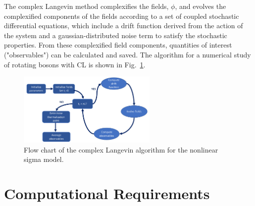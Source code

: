\documentclass[onecolumn, 12pt]{report}
\begin{document}
The complex Langevin method complexifies the fields, $\phi$, and evolves the complexified components of the fields according to a set of coupled stochastic differential equations, which include a drift function derived from the action of the system and a gaussian-distributed noise term to satisfy the stochastic properties. From these complexified field components, quantities of interest ("observables") can be calculated and saved. The algorithm for a numerical study of rotating bosons with CL is shown in Fig.~\ref{Fig:Algorithm}.
%
\vspace{-3mm}
\begin{figure}[h]
\centering
\includegraphics[width=0.6\textwidth]{./algorithm.pdf}
\caption{\label{Fig:Algorithm} Flow chart of the complex Langevin algorithm for the nonlinear sigma model.\vspace{-3mm}}
\end{figure}
\vspace{-3mm}
%

\section{Computational Requirements}
\end{document}
